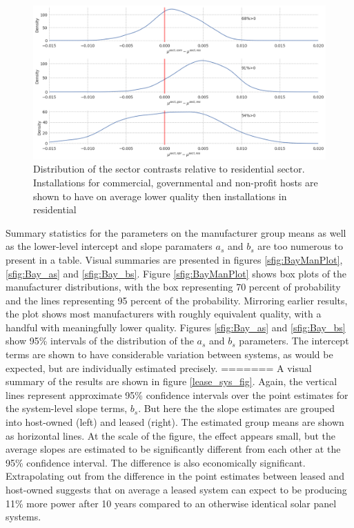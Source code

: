 \documentclass[12pt]{article}
\begin{document}
\begin{figure}
  \centering
  \includegraphics[width=.6\linewidth]{figures/mu_sectors.png}
  \caption{Distribution of the sector contrasts relative to residential sector. Installations for commercial, governmental and non-profit hosts are shown to have on average lower quality then installations in residential}
  \label{mu_sectors}
\end{figure}

Summary statistics for the parameters on the manufacturer group means as well as the lower-level intercept and slope paramaters $a_s$ and $b_s$ are too numerous to present in a table. Visual summaries are presented in figures \ref{sfig:BayManPlot}, \ref{sfig:Bay_as} and \ref{sfig:Bay_bs}. Figure \ref{sfig:BayManPlot} shows box plots of the manufacturer distributions, with the box representing 70 percent of probability and the lines representing 95 percent of the probability. Mirroring earlier results, the plot shows most manufacturers with roughly equivalent quality, with a handful with meaningfully lower quality. Figures \ref{sfig:Bay_as} and \ref{sfig:Bay_bs} show 95\% intervals of the distribution of the $a_s$ and $b_s$ parameters. The intercept terms are shown to have considerable variation between systems, as would be expected, but are individually estimated precisely.
=======
A visual summary of the results are shown in figure \ref{lease_sys_fig}. Again, the vertical lines represent approximate 95\% confidence intervals over the point estimates for the system-level slope terms, $b_s$. But here the the slope estimates are grouped into host-owned (left) and leased (right). The estimated group means are shown as horizontal lines. At the scale of the figure, the effect appears small, but the average slopes are estimated to be significantly different from each other at the 95\% confidence interval. The difference is also economically significant. Extrapolating out from the difference in the point estimates between leased and host-owned suggests that on average a leased system can expect to be producing 11\% more power after 10 years compared to an otherwise identical solar panel systems.
\end{document}
